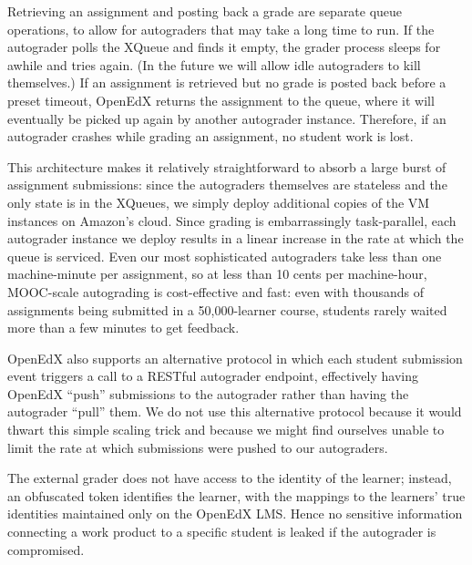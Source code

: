 Retrieving an
assignment and posting back a 
grade are separate queue operations, to allow for autograders that may
take a long time to run.  
If the autograder polls the XQueue and finds it empty, the grader
process sleeps for awhile and tries again.  (In the future we will allow
idle autograders to kill themselves.)
If an assignment is retrieved but no grade is posted back before a
preset timeout, OpenEdX returns the assignment to the queue, where it will
eventually be picked up again by another autograder instance.
Therefore, if an autograder crashes while grading an assignment, no
student work is lost.

This architecture makes it relatively straightforward to absorb a large
burst of assignment submissions: since  the autograders 
  themselves are stateless and the only state is in the XQueues,
we simply deploy additional copies of
the VM instances on Amazon's cloud.  Since grading is embarrassingly
task-parallel, each autograder instance we deploy results in a linear
increase in the rate at which the queue is serviced.  
Even our most sophisticated autograders take less than one
machine-minute per assignment, so at less than 10 cents per machine-hour,
MOOC-scale 
autograding is cost-effective and fast: even with
thousands of assignments being submitted in a 50,000-learner course,
students rarely waited more than a few minutes to get feedback.

OpenEdX also supports an alternative protocol in which each student
submission event triggers a call to a RESTful autograder endpoint,
effectively having OpenEdX ``push'' submissions to the autograder rather
than having the autograder ``pull'' them.  We do not use this
alternative protocol because it would thwart this simple scaling trick
and because we might find ourselves unable to limit the rate at which
submissions were pushed to our autograders.

The external grader does not have access to
the identity of the learner; instead, an obfuscated token identifies the
learner, with the mappings to the learners' true identities maintained only on the
OpenEdX LMS.  Hence no sensitive information connecting a work product
to a specific student is leaked if the autograder is compromised.

